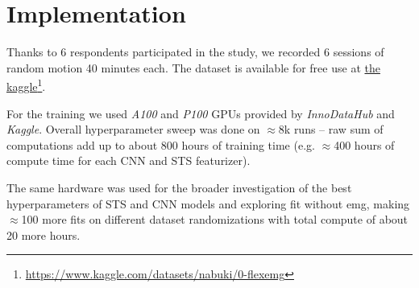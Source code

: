 \chapter{Implementation}
\label{chap:impl}

Thanks to 6 respondents participated in the study, we recorded 6 sessions of random motion 40 minutes each. The dataset is available for free use at \href{https://www.kaggle.com/datasets/nabuki/0-flexemg}{the kaggle}\footnote{\url{https://www.kaggle.com/datasets/nabuki/0-flexemg}}.

For the training we used \emph{A100} and \emph{P100} GPUs provided by \emph{InnoDataHub} and \emph{Kaggle}. Overall hyperparameter sweep was done on $\approx$8k runs -- raw sum of computations add up to about 800 hours of training time (e.g. $\approx$400 hours of compute time for each CNN and STS featurizer).

The same hardware was used for the broader investigation of the best hyperparameters of STS and CNN models and exploring fit without emg, making $\approx$100 more fits on different dataset randomizations with total compute of about 20 more hours.